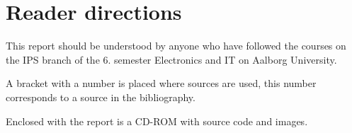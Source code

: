 \section*{Reader directions}\label{afs:laesevejledning}
This report should be understood by anyone who have followed the courses on the IPS branch of the 6. semester Electronics and IT on Aalborg University.

A bracket with a number is placed where sources are used, this number corresponds to a source in the bibliography.

Enclosed with the report is a CD-ROM with source code and images. 
